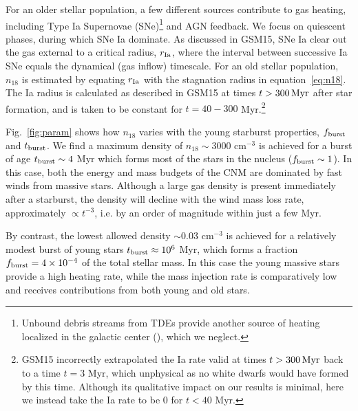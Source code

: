 \documentclass[usenatbib,fleqn]{mnras}
\newcommand{\Msun}{{\rm M_\odot}}
\begin{document}
For an older stellar population, a few
different sources contribute to gas heating, including Type Ia Supernovae (SNe)\footnote{Unbound
  debris streams from TDEs provide another source of heating localized
  in the galactic center (\citealt{Guillochon+2015a}), which we
  neglect.} and AGN feedback.  We focus on
quiescent phases, during which SNe Ia dominate.  As discussed in
GSM15, SNe Ia clear out the gas external to a critical radius, $r_{\rm
  Ia}$, where the interval between successive Ia SNe equals the
dynamical (gas inflow) timescale.  For an old stellar population,
$n_{18}$ is estimated by equating $r_{\rm Ia}$ with the stagnation
radius in equation~\eqref{eq:n18}.  The Ia radius is calculated as
described in GSM15 at times $t>300 \,{\rm Myr}$ after star formation,
and is taken to be constant for $t = 40-300$ Myr.\footnote{GSM15
  incorrectly extrapolated the Ia rate valid at times $t>300 \,{\rm
    Myr}$ back to a time $t = 3$ Myr, which unphysical as no white
  dwarfs would have formed by this time.  Although its qualitative
  impact on our results is minimal, here we instead take the Ia rate
  to be 0 for $ t < 40$ Myr.}


Fig.~\ref{fig:param} shows how $n_{18}$ varies with the young
starburst properties, $f_{\rm burst}$ and $t_{\rm burst}$.  We find a
maximum density of $n_{18} \sim 3000$ cm$^{-3}$ is achieved for a
burst of age $t_{\rm burst} \sim 4$ Myr which forms most of the stars
in the nucleus ($f_{\rm burst} \sim 1$).  In this case, both the energy
and mass budgets of the CNM are dominated by fast winds from massive
stars.  Although a large gas density is present immediately after a starburst, the density will decline with the wind
mass loss rate, approximately $\propto t^{-3}$, i.e. by an order of magnitude within just a few Myr.  

By contrast, the lowest allowed density $\sim 0.03$ cm$^{-3}$ is
achieved for a relatively modest burst of young stars $t_{\rm burst}
\approx 10^{6}$ Myr, which forms a fraction $f_{\rm burst} = 4\times
10^{-4}$ of the total stellar mass. In this case the young massive
stars provide a high heating rate, while the mass injection rate is
comparatively low and receives contributions from both young and old
stars.
\end{document}
